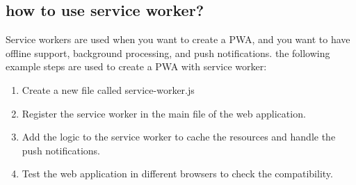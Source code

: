 \documentclass[12pt,a4paper, twosite]{article}
\begin{document}
\subsection{how to use service worker?}
\label{sec:orgf3e3e7}

Service workers are used when you want to create a PWA, and you want to have offline support, background processing, and push notifications.
the following example steps are used to create a PWA with service worker:

\begin{enumerate}
  \item Create a new file called service-worker.js
  \item Register the service worker in the main file of the web application.
  \item Add the logic to the service worker to cache the resources and handle the push notifications.
  \item Test the web application in different browsers to check the compatibility.
  
\end{enumerate}
\end{document}
